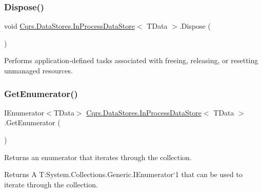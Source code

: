 \subsubsection{\texorpdfstring{Dispose()}{Dispose()}}
{\footnotesize\ttfamily void \hyperlink{classCqrs_1_1DataStores_1_1InProcessDataStore}{Cqrs.\+Data\+Stores.\+In\+Process\+Data\+Store}$<$ T\+Data $>$.Dispose (\begin{DoxyParamCaption}{ }\end{DoxyParamCaption})}



Performs application-\/defined tasks associated with freeing, releasing, or resetting unmanaged resources. 

\mbox{\label{classCqrs_1_1DataStores_1_1InProcessDataStore_a867c2badec9f0669cf70257f5572b701_a867c2badec9f0669cf70257f5572b701}} 
\subsubsection{\texorpdfstring{Get\+Enumerator()}{GetEnumerator()}}
{\footnotesize\ttfamily I\+Enumerator$<$T\+Data$>$ \hyperlink{classCqrs_1_1DataStores_1_1InProcessDataStore}{Cqrs.\+Data\+Stores.\+In\+Process\+Data\+Store}$<$ T\+Data $>$.Get\+Enumerator (\begin{DoxyParamCaption}{ }\end{DoxyParamCaption})}



Returns an enumerator that iterates through the collection. 

\begin{DoxyReturn}{Returns}
A T\+:\+System.\+Collections.\+Generic.\+I\+Enumerator`1 that can be used to iterate through the collection. 
\end{DoxyReturn}
\mbox{\label{classCqrs_1_1DataStores_1_1InProcessDataStore_a43a93c614a403181e0641106ca9509d6_a43a93c614a403181e0641106ca9509d6}} 
